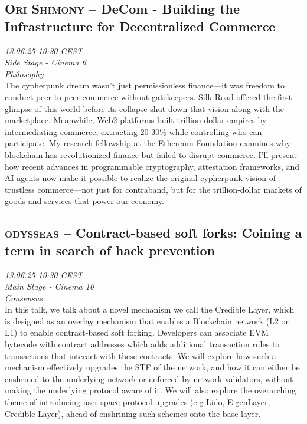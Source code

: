\clearpage
\subsection {\textsc{Ori Shimony}  -- DeCom - Building the Infrastructure for Decentralized Commerce} \noindent \textit {13.06.25 10:30 CEST\\ Side Stage - Cinema 6\\ Philosophy}\\[1em] The cypherpunk dream wasn't just permissionless finance—it was freedom to conduct peer-to-peer commerce without gatekeepers. Silk Road offered the first glimpse of this world before its collapse shut down that vision along with the marketplace. Meanwhile, Web2 platforms built trillion-dollar empires by intermediating commerce, extracting 20-30\% while controlling who can participate. My research fellowship at the Ethereum Foundation examines why blockchain has revolutionized finance but failed to disrupt commerce. I'll present how recent advances in programmable cryptography, attestation frameworks, and AI agents now make it possible to realize the original cypherpunk vision of trustless commerce—not just for contraband, but for the trillion-dollar markets of goods and services that power our economy.

\clearpage
\subsection {\textsc{odysseas}  -- Contract-based soft forks: Coining a term in search of hack prevention} \noindent \textit {13.06.25 10:30 CEST\\ Main Stage - Cinema 10\\ Consensus}\\[1em] In this talk, we talk about a novel mechanism we call the Credible Layer, which is designed as an overlay mechanism that enables a Blockchain network (L2 or L1) to enable contract-based soft forking. Developers can associate EVM bytecode with contract addresses which adds additional transaction rules  to transactions that interact with these contracts. We will explore how such a mechanism effectively upgrades the STF of the network, and how it can either be enshrined to the underlying network or enforced by network validators, without making the underlying protocol aware of it. We will also explore the overarching theme of introducing user-space protocol upgrades (e.g Lido, EigenLayer, Credible Layer), ahead of enshrining such schemes onto the base layer.

